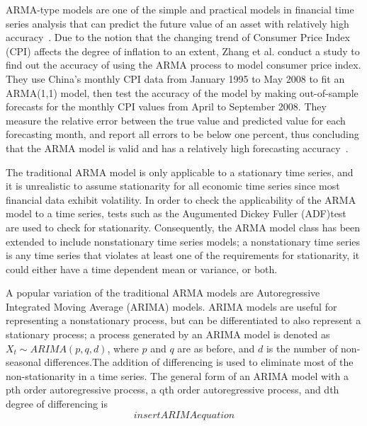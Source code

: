 \documentclass[13pt]{report}
\begin{document}
ARMA-type models are one of the simple and practical models in financial time series analysis that can predict the future value of an asset with relatively high accuracy~\cite{zhang2013research}. Due to the notion that the changing trend of Consumer Price Index (CPI) affects the degree of inflation to an extent, Zhang et al. conduct a study to find out the accuracy of using the ARMA process to model consumer price index. They use China's monthly CPI data from January 1995 to May 2008 to fit an ARMA(1,1) model, then test the accuracy of the model by making out-of-sample forecasts for the monthly CPI values from April to September 2008. They measure the relative error between the true value and predicted value for each forecasting month, and report all errors to be below one percent, thus concluding that the ARMA model is valid and has a relatively high forecasting accuracy~\cite{zhang2013research}.\par


The traditional ARMA model is only applicable to a stationary time series, and it is unrealistic to assume stationarity for all economic time series since most financial data exhibit volatility. In order to check the applicability of the ARMA model to a time series, tests such as the Augumented Dickey Fuller  (ADF)test are used to check for stationarity. Consequently, the ARMA model class has been extended to include nonstationary time series models; a nonstationary time series is any time series that violates at least one of the requirements for stationarity, it could either have a time dependent mean or variance, or both.\par 

A popular variation of the traditional ARMA models are Autoregressive Integrated Moving Average (ARIMA) models. ARIMA models are useful for representing a nonstationary process, but can be differentiated to also represent a stationary process; a process generated by an ARIMA  model is denoted as $X_{t}\sim ARIMA(p,q,d)$, where $p$ and $q$ are as before, and $d$ is the number of non-seasonal differences.The addition of differencing is used to eliminate most of the non-stationarity in a time series. The general form of an ARIMA model with a pth order autoregressive process, a qth order autoregressive process, and dth degree of differencing is\[insert ARIMA equation\]
\end{document}
